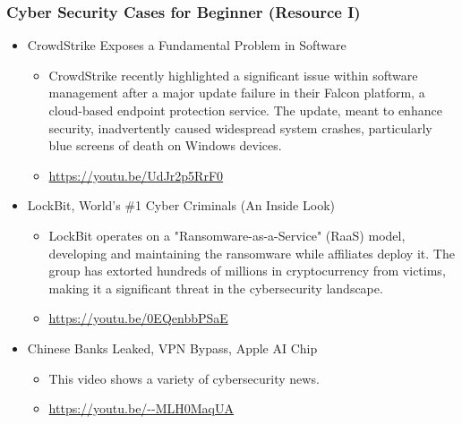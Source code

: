 \documentclass[aspectratio=169, xcolor=table, notheorems, hyperref={pdfpagelabels=false}]{beamer}
\begin{document}
\begin{frame}[fragile]
\frametitle{Cyber Security Cases for Beginner (Resource I)}
\begin{itemize}
\item CrowdStrike Exposes a Fundamental Problem in Software
\begin{itemize}
\item CrowdStrike recently highlighted a significant issue within software management after a 
      major update failure in their Falcon platform, a cloud-based endpoint protection service. 
      The update, meant to enhance security, inadvertently caused widespread system crashes, 
      particularly blue screens of death on Windows devices.
\item \url{https://youtu.be/UdJr2p5RrF0}
\end{itemize}
\item LockBit, World’s \#1 Cyber Criminals (An Inside Look)
\begin{itemize}
\item LockBit operates on a "Ransomware-as-a-Service" (RaaS) model, developing and maintaining 
      the ransomware while affiliates deploy it. The group has extorted hundreds of millions 
      in cryptocurrency from victims, making it a significant threat in the cybersecurity landscape.
\item \url{https://youtu.be/0EQenbbPSaE}
\end{itemize}
\item Chinese Banks Leaked, VPN Bypass, Apple AI Chip
\begin{itemize}
\item This video shows a variety of cybersecurity news.
\item \url{https://youtu.be/--MLH0MaqUA}
\end{itemize}
\end{itemize}
\end{frame}

\end{document}
